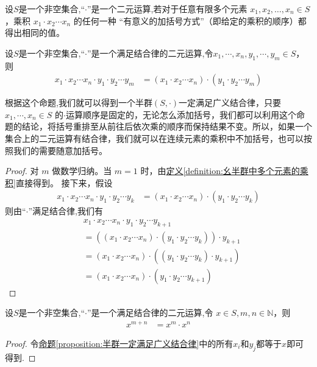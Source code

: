 \documentclass[../../main.tex]{subfiles}
\begin{document}
\begin{definition}[广义结合律]
设$S$是一个非空集合,“$\cdot$”是一个二元运算,若对于任意有限多个元素 $x_1, x_2, \dots, x_n \in S$，乘积 $x_1\cdot x_2 \cdots x_n$ 的任何一种 “有意义的加括号方式”（即给定的乘积的顺序）都得出相同的值。 
\end{definition}

\begin{proposition}\label{proposition:半群一定满足广义结合律}
设$S$是一个非空集合,“$\cdot$”是一个满足结合律的二元运算,令$x_1, \cdots, x_n, y_1, \cdots, y_m \in S$，则
\begin{align*}
x_1 \cdot x_2 \cdots x_n \cdot y_1 \cdot y_2 \cdots y_m &= (x_1 \cdot x_2 \cdots x_n) \cdot (y_1 \cdot y_2 \cdots y_m) \tag{1.6}
\end{align*}
\end{proposition}
\begin{note}
根据这个命题,我们就可以得到一个半群$(S,\cdot)$一定满足广义结合律，只要 $x_1, \cdots, x_n\in S$ 的$\cdot$运算顺序是固定的，无论怎么添加括号，我们都可以利用这个命题的结论，将括号重排至从前往后依次乘的顺序而保持结果不变。所以，如果一个集合上的二元运算有结合律，我们就可以在连续元素的乘积中不加括号，也可以按照我们的需要随意加括号。
\end{note}
\begin{proof}
对 $m$ 做数学归纳。当 $m = 1$ 时，由\hyperref[definition:幺半群中多个元素的乘积]{定义\ref{definition:幺半群中多个元素的乘积}}直接得到。
接下来，假设
\begin{align*}
x_1 \cdot x_2 \cdots x_n \cdot y_1 \cdot y_2 \cdots y_k &= (x_1 \cdot x_2 \cdots x_n) \cdot (y_1 \cdot y_2 \cdots y_k)
\end{align*}
则由“$\cdot$”满足结合律,我们有
\begin{align*}
&x_1 \cdot x_2 \cdots x_n \cdot y_1 \cdot y_2 \cdots y_{k + 1} \\
&= ((x_1 \cdot x_2 \cdots x_n) \cdot (y_1 \cdot y_2 \cdots y_k)) \cdot y_{k + 1} \\
&= (x_1 \cdot x_2 \cdots x_n) \cdot ((y_1 \cdot y_2 \cdots y_k) \cdot y_{k + 1}) \\
&= (x_1 \cdot x_2 \cdots x_n) \cdot (y_1 \cdot y_2 \cdots y_{k + 1}) 
\end{align*}
\end{proof}

\begin{corollary}\label{corollary:满足结合律一定满足广义结合律的推论}
设$S$是一个非空集合,“$\cdot$”是一个满足结合律的二元运算,令 $x \in S, m, n \in \mathbb{N}$，则
\begin{align*}
x^{m + n} &= x^m \cdot x^n
\end{align*} 
\end{corollary}
\begin{proof}
令\hyperref[proposition:半群一定满足广义结合律]{命题\ref{proposition:半群一定满足广义结合律}}中的所有$x_i$和$y_j$都等于$x$即可得到.
\end{proof}
\end{document}
